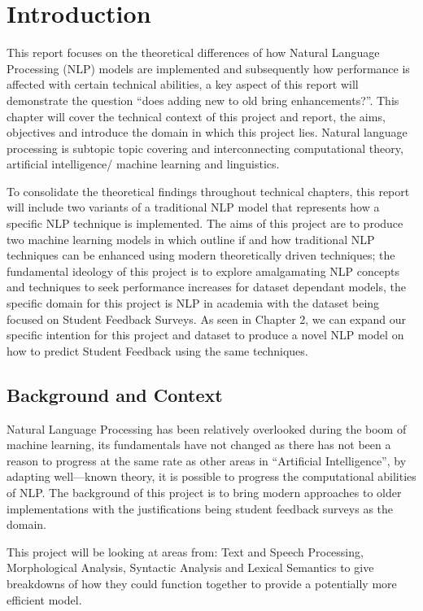 \chapter{Introduction} \label{Introduction}

This report focuses on the theoretical differences of how Natural Language Processing (NLP) models are implemented and subsequently how performance is affected with certain technical abilities, a key aspect of this report will demonstrate the question “does adding new to old bring enhancements?”. This chapter will cover the technical context of this project and report, the aims, objectives and introduce the domain in which this project lies. Natural language processing is subtopic topic covering and interconnecting computational theory, artificial intelligence/ machine learning and linguistics.

To consolidate the theoretical findings throughout technical chapters, this report will include two variants of a traditional NLP model that represents how a specific NLP technique is implemented. The aims of this project are to produce two machine learning models in which outline if and how traditional NLP techniques can be enhanced using modern theoretically driven techniques; the fundamental ideology of this project is to explore amalgamating NLP concepts and techniques to seek performance increases for dataset dependant models, the specific domain for this project is NLP in academia with the dataset being focused on Student Feedback Surveys. As seen in Chapter 2, we can expand our specific intention for this project and dataset to produce a novel NLP model on how to predict Student Feedback using the same techniques.

\section{Background and Context}

Natural Language Processing has been relatively overlooked during the boom of machine learning, its fundamentals have not changed as there has not been a reason to progress at the same rate as other areas in “Artificial Intelligence”, by adapting well---known theory, it is possible to progress the computational abilities of NLP. The background of this project is to bring modern approaches to older implementations with the justifications being student feedback surveys as the domain.

This project will be looking at areas from: Text and Speech Processing, Morphological Analysis, Syntactic Analysis and Lexical Semantics to give breakdowns of how they could function together to provide a potentially more efficient model.

